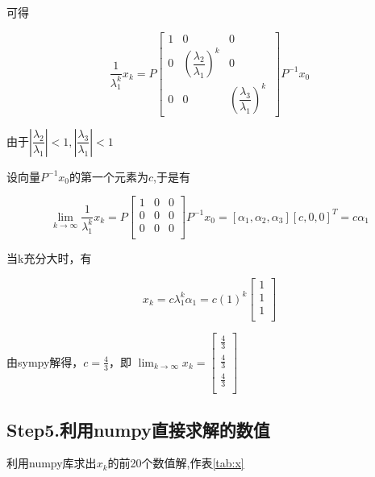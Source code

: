 可得

\begin{equation}
    \dfrac{1}{\lambda_1 ^ k}x_k  = P\begin{bmatrix}
       1 & 0 & 0\\
       0 & (\dfrac{\lambda_2}{\lambda_1})^k & 0\\
       0 & 0 &( \dfrac{\lambda_3}{\lambda_1})^k\ 
    \end{bmatrix}P^{-1}x_0
   \end{equation}
   
由于$|\dfrac{\lambda_2}{\lambda_1}| < 1, |\dfrac{\lambda_3}{\lambda_1}| < 1 $

设向量$P^{-1}x_0$的第一个元素为$c$,于是有

\begin{equation}
    \lim_{k\rightarrow\infty}\dfrac{1}{\lambda_1 ^ k}x_k  = P\begin{bmatrix}
       1 & 0 & 0\\
       0 & 0& 0\\
       0 & 0 & 0\\ 
    \end{bmatrix}P^{-1}x_0
    = [\alpha_1, \alpha_2, \alpha_3][c,0,0]^{T} = c\alpha_1
   \end{equation}

当k充分大时，有


\begin{equation}
    x_k = c\lambda_1^k\alpha_1 = c(1)^k\begin{bmatrix}
        1\\
        1\\
        1\\
    \end{bmatrix}
\end{equation}

由sympy解得，$c = \frac{4}{3}$，即
$\lim_{k\rightarrow\infty}x_k = 
\begin{bmatrix}
    \frac{4}{3}\\
    \frac{4}{3}\\
    \frac{4}{3}\\
\end{bmatrix}$

\subsection{Step5.利用numpy直接求解的数值}
利用numpy库求出$x_k$的前20个数值解,作表\ref{tab:x}

